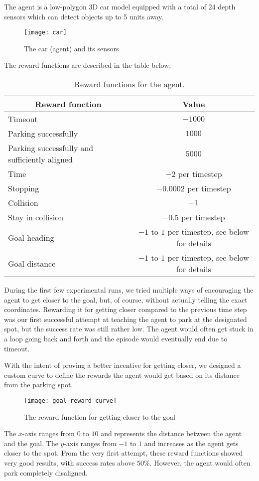 The agent is a low-polygon 3D car model equipped with a total of 24 depth sensors which can detect objects up to 5 units away.
\begin{figure}[H]
    \texttt{[image: car]}
    \caption{The car (agent) and its sensors}
\end{figure}
The reward functions are described in the table below:
\begin{table}[H]
\begin{tabular}{|l|c|}
\hline \multicolumn{1}{|c|}{ Reward function } & Value \\
\hline Timeout & $-1000$ \\
\hline Parking successfully & $1000$ \\
\hline Parking successfully and sufficiently aligned & $5000$ \\
\hline Time & $-2$ per timestep \\
\hline Stopping & $-0.0002$ per timestep \\
\hline Collision & $-1$ \\
\hline Stay in collision & $-0.5$ per timestep \\
\hline Goal heading & $-1$ to $1$ per timestep, see below for details\\
\hline Goal distance & $-1$ to $1$ per timestep, see below for details\\
\hline
\end{tabular}
\caption{\label{tab:rewards}Reward functions for the agent.}
\end{table}
During the first few experimental runs, we tried multiple ways of encouraging the agent to get closer to the goal, but, of course, without actually telling the exact coordinates. Rewarding it for getting closer compared to the previous time step was our first successful attempt at teaching the agent to park at the designated spot, but the success rate was still rather low. The agent would often get stuck in a loop going back and forth and the episode would eventually end due to timeout.

With the intent of proving a better incentive for getting closer, we designed a custom curve to define the rewards the agent would get based on its distance from the parking spot.
\begin{figure}[H]
    \texttt{[image: goal\_reward\_curve]}
    \caption{The reward function for getting closer to the goal}
    \label{fig:goaldist}
\end{figure}
The $x$-axis ranges from $0$ to $10$ and represents the distance between the agent and the goal. The $y$-axis ranges from $-1$ to $1$ and increases as the agent gets closer to the spot. From the very first attempt, these reward functions showed very good results, with success rates above $50\%$. However, the agent would often park completely disaligned.

